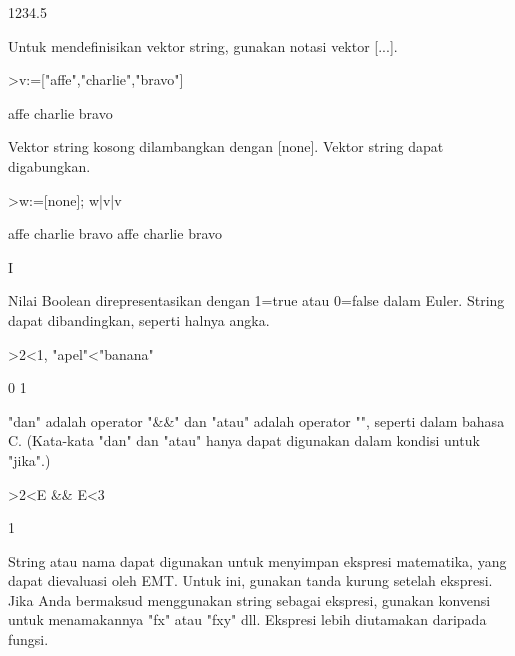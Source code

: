 \documentclass[a4paper,10pt]{article}
\begin{document}
\begin{eulernotebook}
\begin{eulercomment}
\begin{eulercomment}
\begin{euleroutput}
  1234.5
\end{euleroutput}
\begin{eulercomment}
Untuk mendefinisikan vektor string, gunakan notasi vektor [...].
\end{eulercomment}
\begin{eulerprompt}
>v:=["affe","charlie","bravo"]
\end{eulerprompt}
\begin{euleroutput}
  affe
  charlie
  bravo
\end{euleroutput}
\begin{eulercomment}
Vektor string kosong dilambangkan dengan [none]. Vektor string dapat
digabungkan.
\end{eulercomment}
\begin{eulerprompt}
>w:=[none]; w|v|v
\end{eulerprompt}
\begin{euleroutput}
  affe
  charlie
  bravo
  affe
  charlie
  bravo
\end{euleroutput}
\begin{eulercomment}
I
\end{eulercomment}
\begin{eulercomment}
Nilai Boolean direpresentasikan dengan 1=true atau 0=false dalam
Euler. String dapat dibandingkan, seperti halnya angka.
\end{eulercomment}
\begin{eulerprompt}
>2<1, "apel"<"banana"
\end{eulerprompt}
\begin{euleroutput}
  0
  1
\end{euleroutput}
\begin{eulercomment}
"dan" adalah operator "\&\&" dan "atau" adalah operator "\textbar{}\textbar{}", seperti
dalam bahasa C. (Kata-kata "dan" dan "atau" hanya dapat digunakan
dalam kondisi untuk "jika".)
\end{eulercomment}
\begin{eulerprompt}
>2<E && E<3
\end{eulerprompt}
\begin{euleroutput}
  1
\end{euleroutput}
\begin{eulercomment}
String atau nama dapat digunakan untuk menyimpan ekspresi matematika,
yang dapat dievaluasi oleh EMT. Untuk ini, gunakan tanda kurung
setelah ekspresi. Jika Anda bermaksud menggunakan string sebagai
ekspresi, gunakan konvensi untuk menamakannya "fx" atau "fxy" dll.
Ekspresi lebih diutamakan daripada fungsi.


\end{eulercomment}
\end{eulercomment}
\end{eulercomment}
\end{eulernotebook}
\end{document}
